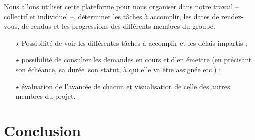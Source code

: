 Nous allons utiliser cette plateforme pour nous organiser dans notre travail -- collectif et individuel --, déterminer les tâches à accomplir, les dates de rendez-vous, de rendus et les progressions des différents membres du groupe.

\begin{itemize}
  \item[$\star$] Possibilité de voir les différentes tâches à accomplir et les délais impartis ;
  \item[$\star$] possibilité de consulter les demandes en cours et d'en émettre (en précisant son échéance, sa durée, son statut, à qui elle va être assignée etc.) ;
  \item[$\star$] évaluation de l'avancée de chacun et visualisation de celle des autres membres du projet.
\end{itemize}


\section{Conclusion}

